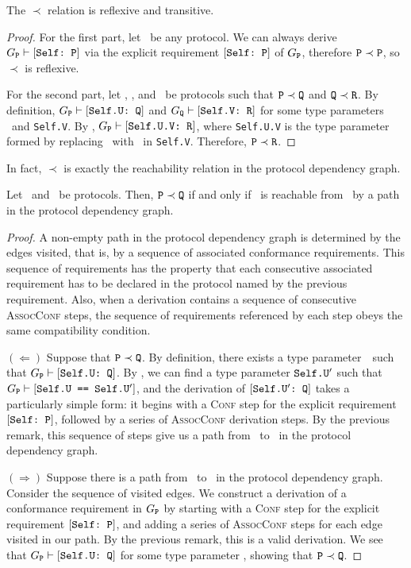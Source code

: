 \documentclass[../generics]{subfiles}
\begin{document}
\begin{proposition}
The $\prec$ relation is reflexive and transitive.
\end{proposition}
\begin{proof}
For the first part, let \tP\ be any protocol. We can always derive $G_{\texttt{P}}\vdash[\texttt{Self:~P}]$ via the explicit requirement $[\texttt{Self:~P}]$ of $G_{\texttt{P}}$, therefore $\texttt{P}\prec\texttt{P}$, so $\prec$ is reflexive.

For the second part, let \tP, \tQ, and \tR\ be protocols such that $\texttt{P}\prec\texttt{Q}$ and $\texttt{Q}\prec\texttt{R}$.  By definition, $G_{\texttt{P}}\vdash[\texttt{Self.U:~Q}]$ and $G_{\texttt{Q}}\vdash[\texttt{Self.V:~R}]$ for some type parameters \SelfU\ and \texttt{Self.V}. By , $G_{\texttt{P}}\vdash[\texttt{Self.U.V:~R}]$, where \texttt{Self.U.V} is the type parameter formed by replacing \tSelf\ with \SelfU\ in \texttt{Self.V}. Therefore, $\texttt{P}\prec\texttt{R}$.
\end{proof}

In fact, $\prec$ is exactly the reachability relation in the protocol dependency graph.

\begin{proposition}
Let \tP\ and \tQ\ be protocols. Then, $\texttt{P}\prec\texttt{Q}$ if and only if \tQ\ is reachable from \tP\ by a path in the protocol dependency graph.
\end{proposition}
\begin{proof}
A non-empty path in the protocol dependency graph is determined by the edges visited, that is, by a sequence of associated conformance requirements. This sequence of requirements has the property that each consecutive associated requirement has to be declared in the protocol named by the previous requirement. Also, when a derivation contains a sequence of consecutive \textsc{AssocConf} steps, the sequence of requirements referenced by each step obeys the same compatibility condition.

$(\Leftarrow)$ Suppose that $\texttt{P}\prec\texttt{Q}$. By definition, there exists a type parameter~\SelfU\ such that $G_{\texttt{P}}\vdash[\texttt{Self.U:~Q}]$. By , we can find a type parameter $\texttt{Self.U}'$ such that $G_{\texttt{P}}\vdash[\texttt{Self.U == $\texttt{Self.U}'$}]$, and the derivation of $[\texttt{$\texttt{Self.U}'$:~Q}]$ takes a particularly simple form: it begins with a \textsc{Conf} step for the explicit requirement $[\texttt{Self:~P}]$, followed by a series of \textsc{AssocConf} derivation steps. By the previous remark, this sequence of steps give us a path from \tP\ to \tQ\ in the protocol dependency graph.

$(\Rightarrow)$ Suppose there is a path from \tP\ to \tQ\ in the protocol dependency graph. Consider the sequence of visited edges. We construct a derivation of a conformance requirement in $G_{\texttt{P}}$ by starting with a \textsc{Conf} step for the explicit requirement $[\texttt{Self:~P}]$, and adding a series of \textsc{AssocConf} steps for each edge visited in our path. By the previous remark, this is a valid derivation. We see that $G_{\texttt{P}}\vdash[\texttt{Self.U:~Q}]$ for some type parameter \SelfU, showing that $\texttt{P}\prec\texttt{Q}$.
\end{proof}
\end{document}
